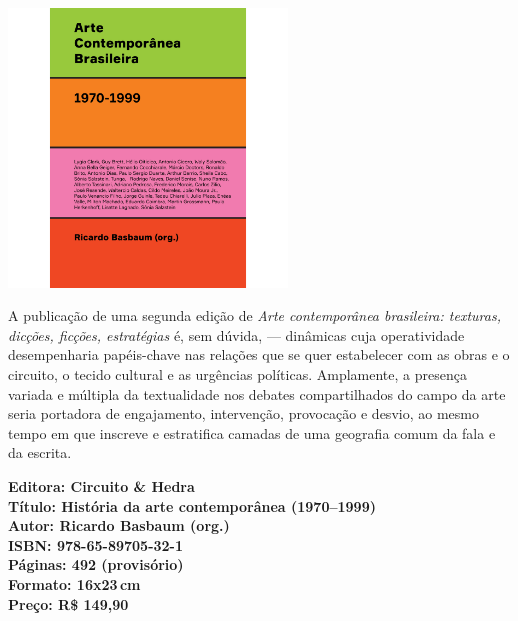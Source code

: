 \pagestyle{circuito}
\label{circuito}

\begin{center}
\hspace*{-3.6cm}
\hspace*{3.1cm}\includegraphics[width=74mm]{./CAPAS/CIRCUITO_BASBAUM.jpg}
\end{center}
\hspace*{-7cm}\hrulefill\hspace*{-7cm}
\medskip

\noindent{}A publicação de uma segunda edição de \textit{Arte contemporânea brasileira: texturas, dicções, ficções, estratégias} é, sem dúvida,  --- dinâmicas cuja operatividade desempenharia papéis-chave nas relações que se quer estabelecer com as obras e o circuito, o tecido cultural e as urgências políticas. Amplamente, a presença variada e múltipla da textualidade nos debates compartilhados do campo da arte seria portadora de engajamento, intervenção, provocação e desvio, ao mesmo tempo em que inscreve e estratifica camadas de uma geografia comum da fala e da escrita.

\vfill
\noindent\begin{minipage}[c]{1\linewidth}
{\small\textbf{
\hspace*{-.1cm}Editora: Circuito \& Hedra\\
Título: História da arte contemporânea (1970–1999)\\
Autor: Ricardo Basbaum (org.)\\ 
ISBN: 978-65-89705-32-1\\
Páginas: 492 (provisório)\\
Formato: 16x23\,cm\\
Preço: R\$ 149,90\\
}}
\end{minipage}
\pagebreak

